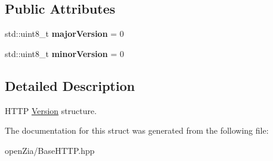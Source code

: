 \subsection*{Public Attributes}
\begin{DoxyCompactItemize}
\item 
\mbox{\label{structo_z_1_1_h_t_t_p_1_1_version_a451d759d7fcdcef197c21140b1e9527e}} 
std\+::uint8\+\_\+t {\bfseries major\+Version} = 0
\item 
\mbox{\label{structo_z_1_1_h_t_t_p_1_1_version_a13e3758802c2b9b974f56d1ea25fafad}} 
std\+::uint8\+\_\+t {\bfseries minor\+Version} = 0
\end{DoxyCompactItemize}


\subsection{Detailed Description}
H\+T\+TP \mbox{\hyperlink{structo_z_1_1_h_t_t_p_1_1_version}{Version}} structure. 

The documentation for this struct was generated from the following file\+:\begin{DoxyCompactItemize}
\item 
open\+Zia/Base\+H\+T\+T\+P.\+hpp\end{DoxyCompactItemize}

